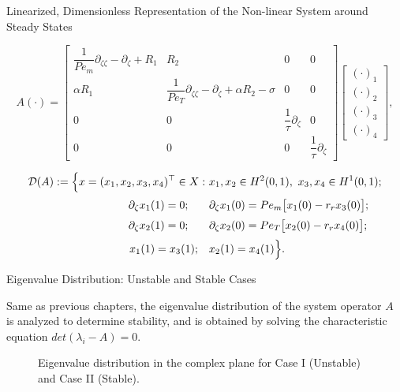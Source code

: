 \documentclass[8pt]{beamer}
\begin{document}
\begin{frame}{Linearized, Dimensionless Representation of the Non-linear System around Steady States}

\begin{equation} \label{eq:3_A_operator}
{A} (\cdot) =
\begin{bmatrix} 
\dfrac{1}{Pe_m} \partial_{\zeta\zeta} - \partial_\zeta + R_1 & R_2 & 0 & 0 \\
\alpha R_1 & \dfrac{1}{Pe_T} \partial_{\zeta\zeta} - \partial_\zeta + \alpha R_2 - \sigma & 0 & 0 \\
0 & 0 & \dfrac{1}{\tau} \partial_\zeta & 0 \\
0 & 0 & 0 & \dfrac{1}{\tau} \partial_\zeta
\end{bmatrix} \begin{bmatrix} (\cdot)_1 \\ (\cdot)_2 \\ (\cdot)_3 \\ (\cdot)_4 \end{bmatrix},
\end{equation}


\begin{equation} \label{eq:3_A_domain}
\begin{aligned}
\mathcal{D}({A}) := \Big\{ x = (x_1, x_2, x_3, x_4)^\top \in X :\ 
& x_1, x_2 \in H^2(0,1),\ x_3, x_4 \in H^1(0,1); \\[0.5ex]
\partial_\zeta x_1(1) = 0; \hspace{1.9em} & \partial_\zeta x_1(0) = Pe_m \bigl[ x_1(0) - r_r x_3(0) \bigr]; \\[0.5ex]
\partial_\zeta x_2(1) = 0; \hspace{1.9em} & \partial_\zeta x_2(0) = Pe_T \bigl[ x_2(0) - r_r x_4(0) \bigr]; \\[0.5ex]
x_1(1) = x_3(1); \quad & x_2(1) = x_4(1)
\Big\}.
\end{aligned}
\end{equation}
\end{frame}




\begin{frame}{Eigenvalue Distribution: Unstable and Stable Cases}

Same as previous chapters, the eigenvalue distribution of the system operator \( A \) is analyzed to determine stability, and is obtained by solving the characteristic equation \( det(\lambda_i - A) = 0 \).

\begin{figure}
    \centering
    
    \caption{Eigenvalue distribution in the complex plane for Case I (Unstable) and Case II (Stable).}
\end{figure}
\end{frame}
\end{document}
